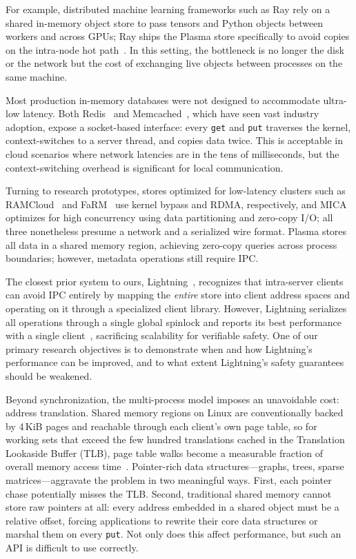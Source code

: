 For example, distributed machine learning frameworks such as Ray rely on a
shared in-memory object store to pass tensors and Python objects between workers
and across GPUs; Ray ships the Plasma store specifically to avoid copies on the
intra-node hot path~\cite{moritz18ray, rayproject2017plasma}. In this setting,
the bottleneck is no longer the disk or the network but the cost of exchanging
live objects between processes on the same machine.

Most production in-memory databases were not designed to accommodate ultra-low
latency. Both Redis~\cite{redis} and Memcached~\cite{nishtala13memcache}, which
have seen vast industry adoption, expose a socket-based interface: every
\texttt{get} and \texttt{put} traverses the kernel, context-switches to a server
thread, and copies data twice. This is acceptable in cloud scenarios where
network latencies are in the tens of milliseconds, but the context-switching
overhead is significant for local communication.

Turning to research prototypes, stores optimized for low-latency clusters such
as RAMCloud~\cite{ousterhout15ramcloud} and FaRM~\cite{dragojevic14farm} use
kernel bypass and RDMA, respectively, and MICA~\cite{lim14mica} optimizes for
high concurrency using data partitioning and zero-copy I/O; all three
nonetheless presume a network and a serialized wire format. Plasma
\cite{rayproject2017plasma} stores all data in a shared memory region, achieving
zero-copy queries across process boundaries; however, metadata operations still
require IPC.

The closest prior system to ours, Lightning~\cite{lightning22}, recognizes that
intra-server clients can avoid IPC entirely by mapping the \emph{entire} store
into client address spaces and operating on it through a specialized client
library. However, Lightning serializes all operations through a single global
spinlock and reports its best performance with a single
client~\cite{lightning22}, sacrificing scalability for verifiable safety. One of
our primary research objectives is to demonstrate when and how Lightning's
performance can be improved, and to what extent Lightning's safety guarantees
should be weakened.

Beyond synchronization, the multi-process model imposes an unavoidable cost:
address translation. Shared memory regions on Linux are conventionally backed by
4\,KiB pages and reachable through each client's own page table, so for working
sets that exceed the few hundred translations cached in the Translation
Lookaside Buffer (TLB), page table walks become a measurable fraction of overall
memory access time~\cite{basu13bigmem, navarro02superpages}. Pointer-rich data
structures---graphs, trees, sparse matrices---aggravate the problem in two
meaningful ways. First, each pointer chase potentially misses the TLB. Second,
traditional shared memory cannot store raw pointers at all: every address
embedded in a shared object must be a relative offset, forcing applications to
rewrite their core data structures or marshal them on every \texttt{put}. Not
only does this affect performance, but such an API is difficult to use
correctly.

